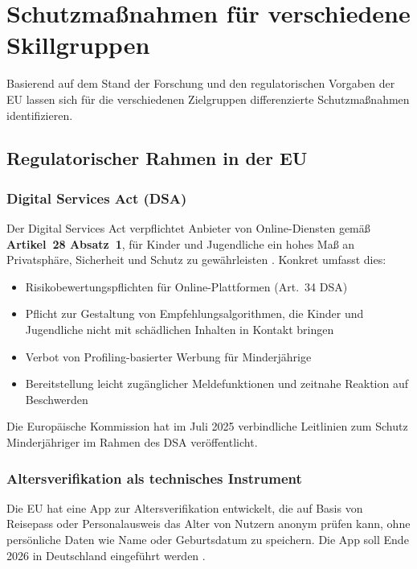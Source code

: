 \documentclass[11pt,a4paper]{article}
\begin{document}
	\section{Schutzmaßnahmen für verschiedene Skillgruppen}
	Basierend auf dem Stand der Forschung und den regulatorischen Vorgaben der EU \cite{dsa,fsm2024,lexology2026} lassen sich für die verschiedenen Zielgruppen differenzierte Schutzmaßnahmen identifizieren.
	
	\subsection{Regulatorischer Rahmen in der EU}
	
	\subsubsection{Digital Services Act (DSA)}
	Der Digital Services Act verpflichtet Anbieter von Online-Diensten gemäß \textbf{Artikel~28 Absatz~1}, für Kinder und Jugendliche ein hohes Maß an Privatsphäre, Sicherheit und Schutz zu gewährleisten \cite{dsa,onlinesicherheit}. Konkret umfasst dies:
	\begin{itemize}
		\item Risikobewertungspflichten für Online-Plattformen (Art.~34 DSA)
		\item Pflicht zur Gestaltung von Empfehlungsalgorithmen, die Kinder und Jugendliche nicht mit schädlichen Inhalten in Kontakt bringen
		\item Verbot von Profiling-basierter Werbung für Minderjährige
		\item Bereitstellung leicht zugänglicher Meldefunktionen und zeitnahe Reaktion auf Beschwerden
	\end{itemize}
	Die Europäische Kommission hat im Juli 2025 verbindliche Leitlinien zum Schutz Minderjähriger im Rahmen des DSA veröffentlicht.
	
	\subsubsection{Altersverifikation als technisches Instrument}
	Die EU hat eine App zur Altersverifikation entwickelt, die auf Basis von Reisepass oder Personalausweis das Alter von Nutzern anonym prüfen kann, ohne persönliche Daten wie Name oder Geburtsdatum zu speichern. Die App soll Ende 2026 in Deutschland eingeführt werden \cite{dataagenda2026}.
	
\end{document}
